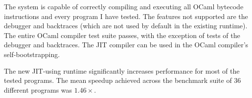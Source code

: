The system is capable of correctly compiling and executing all OCaml
bytecode instructions and every program I have tested. The features not supported are
the debugger and backtraces (which are not used by default in the existing runtime). The entire
OCaml compiler test suite passes, with the exception of tests of
the debugger and backtraces. The JIT compiler can be used in the OCaml compiler's
self-bootstrapping.

The new JIT-using runtime significantly increases performance for most of the tested programs.
The mean speedup achieved across the benchmark suite of 36 different programs was $1.46 \times$.
